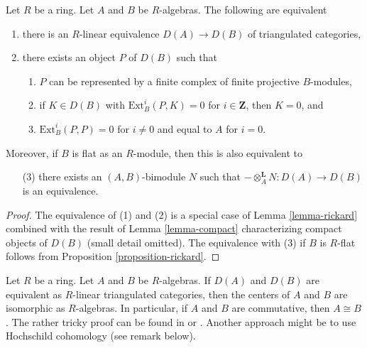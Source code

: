 \begin{lemma}
\label{lemma-rickard-rings}
Let $R$ be a ring.
Let $A$ and $B$ be $R$-algebras. The following are equivalent
\begin{enumerate}
\item there is an $R$-linear equivalence $D(A) \to D(B)$
of triangulated categories,
\item there exists an object $P$ of $D(B)$ such that
\begin{enumerate}
\item $P$ can be represented by a finite complex
of finite projective $B$-modules,
\item if $K \in D(B)$ with $\text{Ext}^i_B(P, K) = 0$ for
$i \in \mathbf{Z}$, then $K = 0$, and
\item $\text{Ext}^i_B(P, P) = 0$ for $i \not = 0$ and
equal to $A$ for $i= 0$.
\end{enumerate}
\end{enumerate}
Moreover, if $B$ is flat as an $R$-module, then this is also
equivalent to
\begin{enumerate}
\item[(3)] there exists an $(A, B)$-bimodule $N$ such that
$- \otimes_A^\mathbf{L} N : D(A) \to D(B)$ is an equivalence.
\end{enumerate}
\end{lemma}

\begin{proof}
The equivalence of (1) and (2) is a special case of
Lemma \ref{lemma-rickard} combined with the result of
Lemma \ref{lemma-compact} characterizing compact objects of $D(B)$
(small detail omitted).
The equivalence with (3) if $B$ is $R$-flat follows from
Proposition \ref{proposition-rickard}.
\end{proof}

\begin{remark}
\label{remark-centers}
Let $R$ be a ring. Let $A$ and $B$ be $R$-algebras.
If $D(A)$ and $D(B)$ are equivalent as $R$-linear triangulated
categories, then the centers of $A$ and $B$ are isomorphic
as $R$-algebras. In particular, if $A$ and $B$ are commutative,
then $A \cong B$. The rather tricky proof can be found in
\cite[Proposition 9.2]{Rickard} or \cite[Proposition 6.3.2]{KZ}.
Another approach might be to use Hochschild cohomology (see
remark below).
\end{remark}

